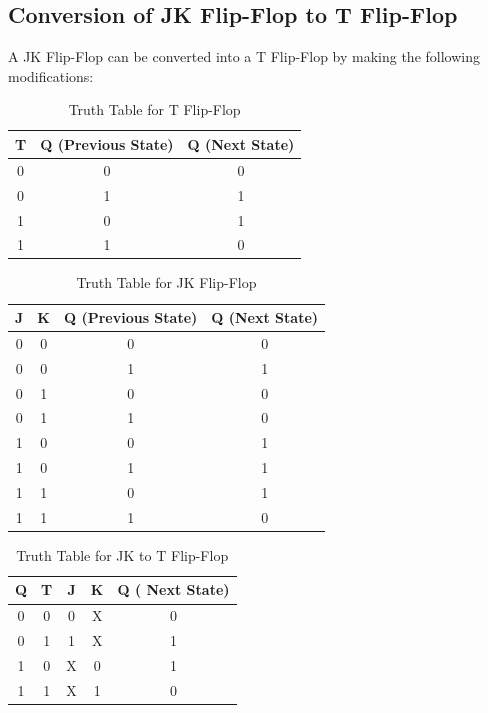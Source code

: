 \documentclass[a4paper,12pt]{article}
\begin{document}
\subsection{Conversion of JK Flip-Flop to T Flip-Flop}
A JK Flip-Flop can be converted into a T Flip-Flop by making the following modifications:
\begin{table}[H]
    \centering
    \begin{tabular}{|c|c|c|}
        \hline
        \textbf{T} & \textbf{Q (Previous State)} & \textbf{Q (Next State)} \\
        \hline
        0 & 0 & 0 \\
        0 & 1 & 1 \\
        1 & 0 & 1 \\
        1 & 1 & 0 \\
        \hline
    \end{tabular}
    \caption{Truth Table for T Flip-Flop}
\end{table}
\begin{table}[H]
    \centering
    \begin{tabular}{|c|c|c|c|}
        \hline
        \textbf{J} & \textbf{K} & \textbf{Q (Previous State)} & \textbf{Q (Next State)} \\
        \hline
        0 & 0 & 0 & 0 \\
        0 & 0 & 1 & 1 \\
        0 & 1 & 0 & 0 \\
        0 & 1 & 1 & 0 \\
        1 & 0 & 0 & 1 \\
        1 & 0 & 1 & 1 \\
        1 & 1 & 0 & 1 \\
        1 & 1 & 1 & 0 \\
        \hline
    \end{tabular}
    \caption{Truth Table for JK Flip-Flop}
\end{table}
\begin{table}[H]
    \centering
    \begin{tabular}{|c|c|c|c|c|}
        \hline
        \textbf{Q} & \textbf{T} & \textbf{J} & \textbf{K} & \textbf{Q ( Next State)} \\
        \hline
        0 & 0 & 0 & X & 0 \\
        0 & 1 & 1 & X & 1 \\
        1 & 0 & X & 0 & 1 \\
        1 & 1 & X & 1 & 0 \\
        \hline
    \end{tabular}
    \caption{Truth Table for JK to T Flip-Flop}
\end{table}
\end{document}
